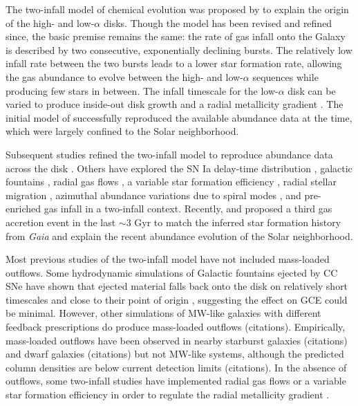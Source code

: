 \documentclass[twocolumn,twocolappendix,linenumbers]{aastex631}
\newcommand{\todo}[1]{{\color{red}#1}}
\begin{document}
The two-infall model of chemical evolution was proposed by \citet{chiappini_chemical_1997} to explain the origin of the high- and low-$\alpha$ disks. Though the model has been revised and refined since, the basic premise remains the same: the rate of gas infall onto the Galaxy is described by two consecutive, exponentially declining bursts. The relatively low infall rate between the two bursts leads to a lower star formation rate, allowing the gas abundance to evolve between the high- and low-$\alpha$ sequences while producing few stars in between. 
The infall timescale for the low-$\alpha$ disk can be varied to produce inside-out disk growth and a radial metallicity gradient \citep{romano_mass_2000}.
The initial model of \citet{chiappini_chemical_1997} successfully reproduced the available abundance data at the time, which were largely confined to the Solar neighborhood.

Subsequent studies refined the two-infall model to reproduce abundance data across the disk \citep[e.g.,][]{chiappini_abundance_2001,chiappini_oxygen_2003}. Others have explored the SN Ia delay-time distribution \citep{matteucci_effect_2009,palicio_analytic_2023}, galactic fountains \citep{spitoni_effects_2009}, radial gas flows \citep{spitoni_effects_2011,palla_chemical_2020}, a variable star formation efficiency \citep{spitoni_effects_2011,palla_chemical_2020}, radial stellar migration \citep{spitoni_effect_2015,palla_mgfe_2022}, azimuthal abundance variations due to spiral modes \citep{spitoni_2d_2019}, and pre-enriched gas infall \citep{palla_chemical_2020,spitoni_remind_2024} in a two-infall context. Recently, \citet{spitoni_beyond_2023} and \citet{palla_mapping_2024} proposed a third gas accretion event in the last $\sim3$ Gyr to match the inferred star formation history from {\it Gaia} \citep{ruiz-lara_recurrent_2020} and explain the recent abundance evolution of the Solar neighborhood.

Most previous studies of the two-infall model have not included mass-loaded outflows. Some hydrodynamic simulations of Galactic fountains ejected by CC SNe have shown that ejected material falls back onto the disk on relatively short timescales \citep{spitoni_galactic_2008,spitoni_effects_2009} and close to their point of origin \citep{melioli_hydrodynamical_2008,melioli_hydrodynamical_2009}, suggesting the effect on GCE could be minimal. However, other simulations of MW-like galaxies with different feedback prescriptions do produce mass-loaded outflows \todo{(citations)}. Empirically, mass-loaded outflows have been observed in nearby starburst galaxies \todo{(citations)} and dwarf galaxies \todo{(citations)} but not MW-like systems, although the predicted column densities are below current detection limits \todo{(citations)}. In the absence of outflows, some two-infall studies have implemented radial gas flows or a variable star formation efficiency in order to regulate the radial metallicity gradient \citep{spitoni_effects_2011,palla_chemical_2020}.
\end{document}
